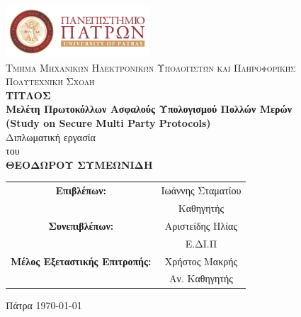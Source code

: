\begin{titlepage}
    \begin{center}
        \includegraphics[width=0.4\textwidth]{00_preamble/images/upatras.png}
        \vspace*{1cm}
        \\ \textsc{Τμήμα Μηχανικών Ηλεκτρονικών Υπολογιστών και Πληροφορικής
        \\Πολυτεχνική Σχολή}
        \vspace{0.3cm}
    \large{
    \textbf{\\ΤΙΤΛΟΣ \\ Μελέτη Πρωτοκόλλων Ασφαλούς Υπολογισμού Πολλών Μερών
    \\ (Study on Secure Multi Party Protocols)}}
        \vspace{0.5cm}
        \\Διπλωματική εργασία \\
        του\\
        \vspace{0.5cm}
        \textbf{ΘΕΟΔΩΡΟΥ ΣΥΜΕΩΝΙΔΗ}\\
        \vspace{1cm}
        
    \end{center}
    \begin{center}
        \begin{tabular}{ c c } 
            \textbf{Επιβλέπων:} & Ιωάννης Σταματίου \\ 
              & Καθηγητής  \\
            \textbf{Συνεπιβλέπων:} & Αριστείδης Ηλίας \\ 
              & Ε.ΔΙ.Π \\
            \textbf{Μέλος Εξεταστικής Επιτροπής:} & Χρήστος Μακρής  \\
            & Αν. Καθηγητής \\

        \end{tabular}
    \end{center}
    \begin{center}
        \vfill
        Πάτρα \today
    \end{center}

\end{titlepage}
